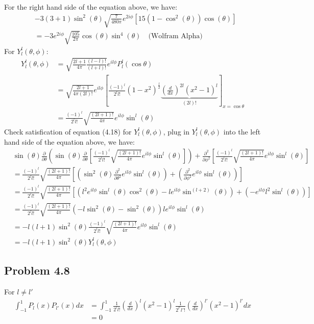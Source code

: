 \documentclass{article}
\begin{document}
For the right hand side of the equation above, we have:
\begin{align*}
	&-3(3+1) \sin^2(\theta) \sqrt{\frac{7}{480\pi}} e^{2i \phi} \left[15(1-\cos^2(\theta))\cos(\theta)\right] \\
	&= -3e^{2i\phi} \sqrt{\frac{105}{2 \pi}} \cos(\theta) \sin^4(\theta) \quad \text{(Wolfram Alpha)}
\end{align*}
For \(Y^l_l (\theta, \phi)\):
\begin{align*}
	Y^l_l(\theta, \phi) &= \sqrt{\frac{2l + 1}{4 \pi} \frac{(l-l)!}{(l+l)!}} e^{il\phi} P^l_l(\cos \theta) \\
	&= \sqrt{\frac{2l + 1}{4\pi (2l)!}} e^{il\phi} \left[\frac{(-1)^l}{2^l l!} (1-x^2)^{\frac{l}{2}} \underbrace{\left(\frac{d}{dx}\right)^{2l} (x^2 - 1)^l}_{(2l)!} \right]_{x = \cos \theta} \\
	&= \frac{(-1)^l}{2^l l!} \sqrt{\frac{(2l+1)!}{4\pi}} e^{il\phi} \sin^l(\theta)
\end{align*}
Check satisfication of equation (4.18) for \(Y^l_l(\theta, \phi)\), plug in \(Y^l_l(\theta, \phi)\) into the left hand side of the equation above, we have:
\begin{align*}
	& \sin(\theta) \frac{\partial}{\partial \theta} \left(\sin(\theta) \frac{\partial}{\partial \theta} \left[\frac{(-1)^l}{2^l l!} \sqrt{\frac{(2l+1)!}{4\pi}} e^{il\phi} \sin^l(\theta)\right]\right) + \frac{\partial^2}{\partial \phi^2} \left[\frac{(-1)^l}{2^l l!} \sqrt{\frac{(2l+1)!}{4\pi}} e^{il\phi} \sin^l(\theta)\right] \\
	&= \frac{(-1)^l}{2^l l!} \sqrt{\frac{(2l+1)!}{4\pi}} \left[ \left(\sin^2(\theta) \frac{\partial^2}{\partial \theta^2} e^{il\phi} \sin^l(\theta)\right) + \left(\frac{\partial^2}{\partial \phi^2} e^{il\phi} \sin^l(\theta)\right)\right] \\
	&= \frac{(-1)^l}{2^l l!} \sqrt{\frac{(2l+1)!}{4\pi}} \left[ \left(l^2 e^{il\phi}\sin^l(\theta) \cos^2(\theta) - le^{il\phi} \sin^{(l+2)}(\theta)\right) + \left(-e^{il\phi} l^2 \sin^l(\theta)\right) \right]\\
	&= \frac{(-1)^l}{2^l l!} \sqrt{\frac{(2l+1)!}{4\pi}} (-l \sin^2(\theta) - \sin^2(\theta)) le^{il\phi} \sin^l(\theta) \\
	&= -l(l+1) \sin^2(\theta) \frac{(-1)^l}{2^l l!} \sqrt{\frac{(2l+1)!}{4\pi}} e^{il\phi} \sin^l(\theta) \\ 
	&= -l(l+1) \sin^2(\theta) Y^l_l(\theta, \phi)
\end{align*}
\subsection*{Problem 4.8}
For \(l \neq l'\)
\begin{align*}
	\int_{-1}^{1} P_l(x) P_{l'}(x) dx &= \int_{-1}^{1} \frac{1}{2^l l!} \left(\frac{d}{dx}\right)^l (x^2 - 1)^l \frac{1}{2^{l'} l'!} \left(\frac{d}{dx}\right)^{l'} (x^2 - 1)^{l'} dx \\
	&= 0
\end{align*}
\end{document}
